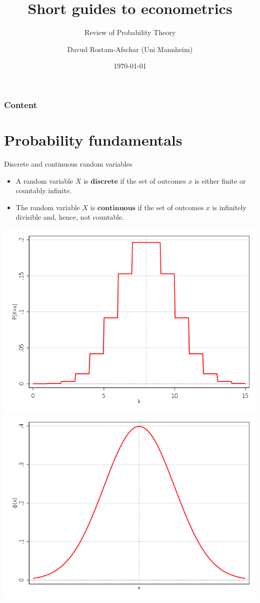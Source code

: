 \documentclass[11pt,table]{beamer}
\title[]{Short guides to econometrics}
\subtitle[]{Review of Probability Theory}
\author[D. Rostam-Afschar]{\textcolor{gray1}{Davud Rostam-Afschar (Uni Mannheim)}}
\date[]{\today}
\begin{document}
\begin{frame}[plain]
  \titlepage
\end{frame}

\begin{frame}
	\frametitle{Content}
	\tableofcontents[]
\end{frame}

\section{Probability fundamentals}
\begin{frame}{Discrete and continuous random variables}
\begin{minipage}{0.5\linewidth}
\begin{itemize}
  \item A random variable $X$ is $\textbf{discrete}$ if the set of outcomes $x$ is either finite or countably
infinite.
  \item  The random variable $X$ is $\textbf{continuous}$ if the set of outcomes $x$ is infinitely divisible and, hence,
not countable.
\end{itemize}
\end{minipage}
\hspace{10pt}
\begin{minipage}{0.35\linewidth}\centering
{\includegraphics[width=1\textwidth]{figures/binomial_pdf}}
{\includegraphics[width=1\textwidth]{figures/normal_pdf}}

\end{minipage}
\end{frame}
\end{document}

